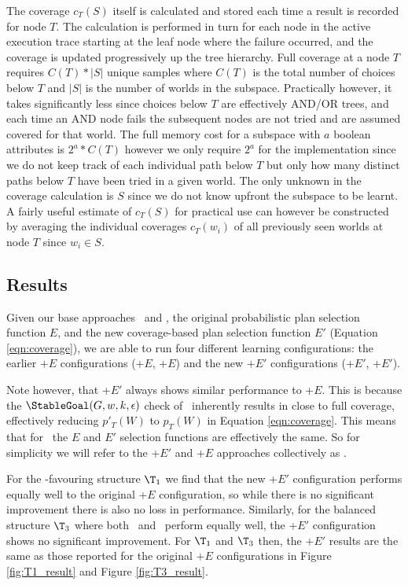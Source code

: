 The coverage $c_T(S)$ itself is calculated and stored each time a result is recorded for node $T$. The calculation is performed in turn for each node in the active execution trace starting at the leaf node where the failure occurred, and the coverage is updated progressively up the tree hierarchy. Full coverage at a node $T$ requires $C(T)*|S|$ unique samples where $C(T)$ is the total number of choices below $T$ and $|S|$ is the number of worlds in the subspace. Practically however, it takes significantly less since choices below $T$ are effectively AND/OR trees, and each time an AND node fails the subsequent nodes are not tried and are assumed covered for that world. The full memory cost for a subspace with $a$ boolean attributes is $2^a*C(T)$ however we only require $2^a$ for the implementation since we do not keep track of each individual path below $T$ but only how many distinct paths below $T$ have been tried in a given world. The only unknown in the coverage calculation is $S$ since we do not know upfront the subspace to be learnt. A fairly useful estimate of $c_T(S)$ for practical use can however be constructed by averaging the individual coverages $c_T(w_i)$ of all previously seen worlds at node $T$ since $w_i \in S$. 

\subsection{Results}

Given our base approaches \CL\ and \BUL, the original probabilistic plan selection function $E$, and the new coverage-based plan selection function $E'$ (Equation \ref{eqn:coverage}), we are able to run four different learning configurations: the earlier $+E$ configurations (\CL+$E$, \BUL+$E$) and the new $+E'$ configurations (\CL+$E'$, \BUL+$E'$).

Note however, that \BUL+$E'$ always shows similar performance to \BUL+$E$. This is because the $\StableGoal(G,w,k,\epsilon)$ check of \BUL\ inherently results in close to full coverage, effectively reducing $p'_T(W)$ to $p_T(W)$ in Equation \ref{eqn:coverage}. This means that for \BUL\, the $E$ and $E'$ selection functions are effectively the same. So for simplicity we will refer to the \BUL+$E'$ and \BUL+$E$ approaches collectively as \BUL.

For the \CL-favouring structure $\T_1$ we find that the new \CL+$E'$ configuration performs equally well to the original \CL+$E$ configuration, so while there is no significant improvement there is also no loss in performance. Similarly, for the balanced structure $\T_3$ where both \CL\ and \BUL\ perform equally well, the \CL+$E'$ configuration shows no significant improvement. For $\T_1$ and $\T_3$ then, the $+E'$ results are the same as those reported for the original $+E$ configurations in Figure \ref{fig:T1_result} and Figure \ref{fig:T3_result}.

